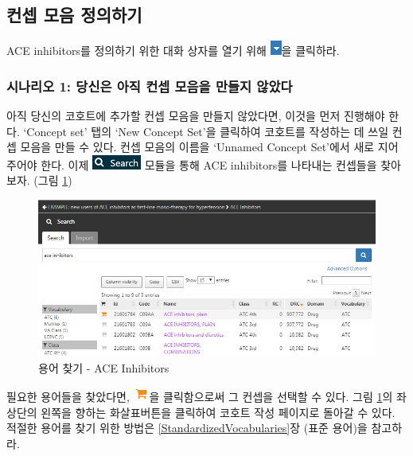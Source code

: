 \documentclass[11pt]{book}
\theoremstyle{definition}
\theoremstyle{definition}
\theoremstyle{definition}
\theoremstyle{remark}
\begin{document}
\subsection{컨셉 모음 정의하기}\label{--}

ACE inhibitors를 정의하기 위한 대화 상자를 열기 위해
\includegraphics{images/Cohorts/downarrow.png}을 클릭하라.

\subsubsection*{시나리오 1: 당신은 아직 컨셉 모음을 만들지
않았다}\label{-1------}

아직 당신의 코호트에 추가할 컨셉 모음을 만들지 않았다면, 이것을 먼저
진행해야 한다. `Concept set' 탭의 `New Concept Set'을 클릭하여 코호트를
작성하는 데 쓰일 컨셉 모음을 만들 수 있다. 컨셉 모음의 이름을 `Unnamed
Concept Set'에서 새로 지어 주어야 한다. 이제
\includegraphics{images/Cohorts/search-2.png} 모듈을 통해 ACE
inhibitors를 나타내는 컨셉들을 찾아보자. (그림 \ref{fig:aceinhibitors})

\begin{figure}

{\centering \includegraphics[width=1\linewidth]{images/Cohorts/aceinhibitors} 

}

\caption{용어 찾기 - ACE Inhibitors}\label{fig:aceinhibitors}
\end{figure}

필요한 용어들을 찾았다면,
\includegraphics{images/Cohorts/shoppingcart.png}을 클릭함으로써 그
컨셉을 선택할 수 있다. 그림 \ref{fig:aceinhibitors}의 좌상단의 왼쪽을
향하는 화살표버튼을 클릭하여 코호트 작성 페이지로 돌아갈 수 있다. 적절한
용어를 찾기 위한 방법은 \ref{StandardizedVocabularies}장 (표준 용어)을
참고하라.
\end{document}
